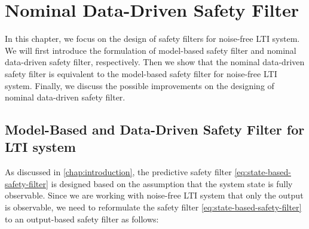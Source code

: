 \chapter{Nominal Data-Driven Safety Filter}\label{chap:nominal-ddsf}

In this chapter, we focus on the design of safety filters for noise-free LTI system.
We will first introduce the formulation of model-based safety filter and nominal data-driven safety filter, respectively.
Then we show that the nominal data-driven safety filter is equivalent to the model-based safety filter for noise-free LTI system.
Finally, we discuss the possible improvements on the designing of nominal data-driven safety filter.


\section{Model-Based and Data-Driven Safety Filter for LTI system}\label{sec:formulation-nominal}

As discussed in \cref{chap:introduction}, the predictive safety filter \cref{eq:state-based-safety-filter} is designed based on the assumption that the system state is fully observable.
Since we are working with noise-free LTI system that only the output is observable, we need to reformulate the safety filter \cref{eq:state-based-safety-filter} to an output-based safety filter as follows:

